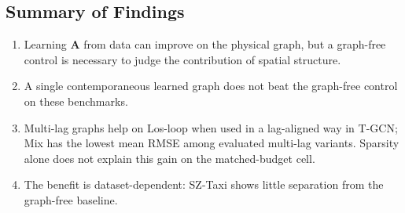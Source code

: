 \subsection{Summary of Findings}\label{sec:res-summary}

\begin{enumerate}
\item Learning $\mathbf{A}$ from data can improve on the physical graph,
but a graph-free control is necessary to judge the contribution of spatial
structure.
\item A single contemporaneous learned graph does not beat the graph-free
control on these benchmarks.
\item Multi-lag graphs help on Los-loop when used in a lag-aligned way in
T-GCN; Mix has the lowest mean RMSE among evaluated multi-lag variants.
Sparsity alone does not explain this gain on the matched-budget cell.
\item The benefit is dataset-dependent: SZ-Taxi shows little separation
from the graph-free baseline.
\end{enumerate}

